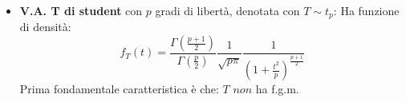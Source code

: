 \begin{itemize}
     \begin{observation}
     Si ricordano:
     \begin{itemize}
         \item $X\sim Bin(n,\theta)\longrightarrow m_X(t)=[\theta e^t+(1-\theta)]^n$
         \item $X\sim \Gamma(\theta_1,\theta_2)\longrightarrow m_X(t)=\Big(${\large $\frac{\theta_2}{\theta_2-t}$}$\Big)^{\theta_1}$
         \item $X\sim N(\theta_1,\theta_2)\longrightarrow m_X(t)=exp(\theta_1t+\theta_2\frac{t^2}{2})$
         \item $X\sim \Gamma(\frac{p}{2},\frac{1}{2})\longrightarrow m_X(t)=(1-2t)^{\frac{p}{2}}$
     \end{itemize}
     \end{observation}
     
     \vspace{15px}
     
     \begin{proposition}
     Siano $Y_1,...,Y_n$ v.a. ind. t.c. $Y_i\sim\chi_{p_i}^2$ per $i=1,...,n$ allora si ha che $\sum\limits_{i=1}^nY_i\sim\chi_p^2$ dove $p=\sum\limits_{i=1}^np_i$
    \begin{proof}
    Basta osservare la f.g.m chiamando $Y=\sum\limits_{i=1}^nY_i$: \[m_{Y_i}(t)=(1-2t)^{\frac{p_i}{2}} \Rightarrow m_Y(t)=\prod_{i=1}^nm_{Y_i}(t)=\prod_{i=1}^n(1-2t)^{\frac{p_i}{2}}=(1-2t)^p\]
    \end{proof}
     \end{proposition}
     
     \vspace{10px}
     
     \newcommand{\Aa}{\alpha}
    \newcommand{\Bb}{\beta} 
     -Studiamo ora i momenti della v.a. $X\sim\Gamma(\alpha,\lambda)$:
     
     \[\E X^{\beta} = \int_0^{+\infty} x^{\beta}\frac{\lambda^{\Aa}}{\Gamma(\Aa)}x^{\Aa-1}e^{-\lambda x} \,dx = \frac{\lambda^{\Aa}}{\Gamma(\Aa)}\int_0^{+\infty}\Big(\frac{y}{\lambda}\Big)^{\Aa+\Bb-1}e^{-y}\frac{1}{y} \,dy\] 
     \[=\frac{\lambda^{-\Bb}}{\Gamma(\Aa)}\int_0^{+\infty}y^{\Aa+\Bb-1}e^{-y} \,dy = \frac{\Gamma(\Aa+\Bb)}{\lambda^{\Bb}\Gamma(\Aa)}\]
     Dunque:
     \begin{itemize}
         \item $\E X=${\large $\frac{\Aa}{\lambda}$}
         \item $\E X^2=${\large $\frac{\Aa(\Aa+1)}{\lambda^2}$}
     \end{itemize}
     Ottenendo: \[\V X=\frac{\Aa}{\lambda^2}\]
     \vspace{10px}
     \item \textbf{V.A. T di student} con $p$ gradi di libertà, denotata con $T\sim t_p$:
     \newline
     Ha funzione di densità: \[f_T(t)=\frac{\Gamma(\frac{p+1}{2})}{\Gamma(\frac{p}{2})}\frac{1}{\sqrt{p\pi}}\frac{1}{(1+\frac{t^2}{p})^{\frac{p+1}{2}}}\]
     Prima fondamentale caratteristica è che: $T$ $non$ ha f.g.m.


\end{itemize}

